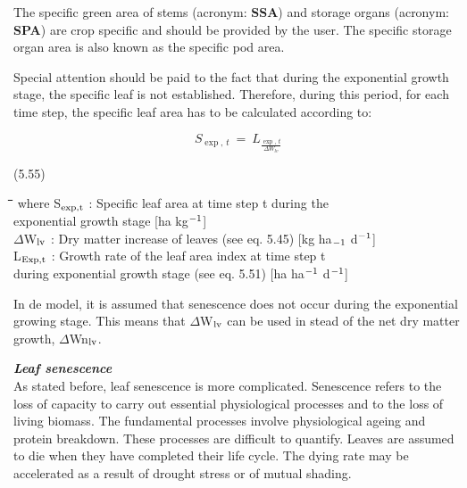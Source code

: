 The specific green area of stems (acronym: {\bf SSA}) and storage organs (acronym: {\bf SPA}) are
crop specific and should be provided by the user. The specific storage organ area is also
known as the specific pod area.








Special attention should be paid to the fact that during the exponential growth stage, the
specific leaf is not established. Therefore, during this period, for each time step, the
specific leaf area has to be calculated according to:

\begin{displaymath}
S _{\exp ,\, t} ~=~L _{\frac{\exp ,\, t}{\Delta W _{lv} }}
\end{displaymath}

 
\strut\hfill (5.55)

\nwln
\begin{tabbing}
\hspace{1.27cm}\=\hspace{1.27cm}\=\hspace{1.27cm}\=\hspace{1.27cm}\=%
\hspace{1.27cm}\=\hspace{1.27cm}\=\hspace{1.27cm}\=\hspace{1.27cm}\=%
\hspace{1.27cm}\=\hspace{1.27cm}\=\kill
where S$_{{\rm exp,t}}$ : Specific leaf area at time step t during the \\
   exponential growth stage         [ha kg$^{{\rm -1}}$]\\
$\Delta$W$_{{\rm lv}}$ : Dry matter increase of leaves (see eq. 5.45)        [kg ha$_{{\rm -1}}$ d$^{{\rm -1}}$]\\
L$_{{\rm Exp,t}}$ : Growth rate of the leaf area index at time step t\\
   during exponential growth stage (see eq. 5.51)        [ha ha$^{{\rm -1}}$ d$^{{\rm -1}}$]
\end{tabbing}

 
In de model, it is assumed that senescence does not occur during the exponential growing
stage. This means that $\Delta$W$_{{\rm lv}}$ can be used in stead of the net dry matter growth, $\Delta$Wn$_{{\rm lv}}$.



{\bf {\it Leaf senescence\/}}\\
As stated before, leaf senescence is more complicated. Senescence refers to the loss of
capacity to carry out essential physio\-logical processes and to the loss of living biomass.
The fundamental processes involve physiological ageing and protein breakdown. These
processes are difficult to quantify. Leaves are assumed to die when they have completed
their life cycle. The dying rate may be accelerated as a result of drought stress or of
mutual shading.



